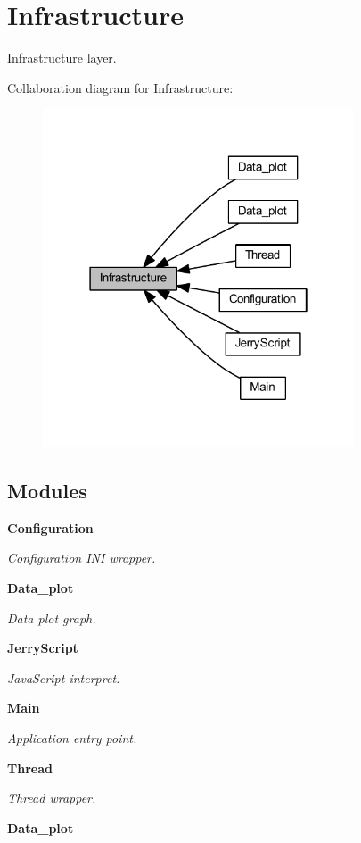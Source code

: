 \section{Infrastructure}
\label{group___infrastructure}


Infrastructure layer.  


Collaboration diagram for Infrastructure\+:
\nopagebreak
\begin{figure}[H]
\begin{center}
\leavevmode
\includegraphics[width=262pt]{group___infrastructure}
\end{center}
\end{figure}
\subsection*{Modules}
\begin{DoxyCompactItemize}
\item 
\textbf{ Configuration}
\begin{DoxyCompactList}\small\item\em Configuration I\+NI wrapper. \end{DoxyCompactList}\item 
\textbf{ Data\+\_\+plot}
\begin{DoxyCompactList}\small\item\em Data plot graph. \end{DoxyCompactList}\item 
\textbf{ Jerry\+Script}
\begin{DoxyCompactList}\small\item\em Java\+Script interpret. \end{DoxyCompactList}\item 
\textbf{ Main}
\begin{DoxyCompactList}\small\item\em Application entry point. \end{DoxyCompactList}\item 
\textbf{ Thread}
\begin{DoxyCompactList}\small\item\em Thread wrapper. \end{DoxyCompactList}\item 
\textbf{ Data\+\_\+plot}
\end{DoxyCompactItemize}
